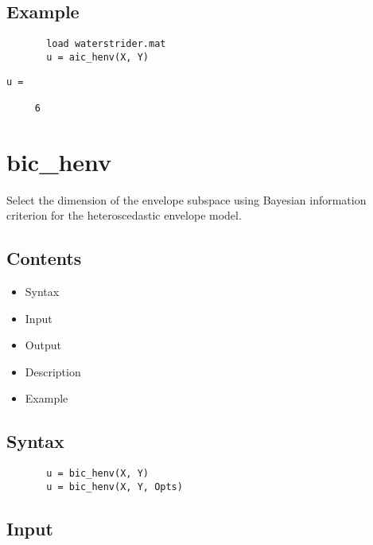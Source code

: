 \documentclass[a4paper,11pt,openany]{memoir}
\begin{document}
\subsection*{Example}


\begin{verbatim}       load waterstrider.mat
       u = aic_henv(X, Y)\end{verbatim}
    
        \color{lightgray}\ttfamily \begin{verbatim}
u =

     6

\end{verbatim} \rmfamily
\color{black}
    \newpage

\rmfamily
\color{black}\section{bic\_henv}

\begin{par}
Select the dimension of the envelope subspace using Bayesian information criterion for the heteroscedastic envelope model.
\end{par} \vspace{1em}

\subsection*{Contents}

\begin{itemize}
\setlength{\itemsep}{-1ex}
   \item Syntax
   \item Input
   \item Output
   \item Description
   \item Example
\end{itemize}


\subsection*{Syntax}


\begin{verbatim}       u = bic_henv(X, Y)
       u = bic_henv(X, Y, Opts)\end{verbatim}
    

\subsection*{Input}
\end{document}
